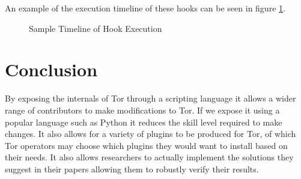\documentclass[9pt,technote]{IEEEtran}
\begin{document}
An example of the execution timeline of these hooks can be seen in figure \ref{fig:timeline}.
\begin{figure}[h!]
\centering
{}
\caption{Sample Timeline of Hook Execution}
\label{fig:timeline}
\end{figure}

\section{Conclusion}
By exposing the internals of Tor through a scripting language it allows a wider
range of contributors to make modifications to Tor. If we expose it using a
popular language such as Python it reduces the skill level required to make
changes. It also allows for a variety of plugins to be produced for Tor, of
which Tor operators may choose which plugins they would want to install based
on their needs. It also allows researchers to actually implement the solutions
they suggest in their papers allowing them to robustly verify their results.

\nocite{*}


\end{document}
